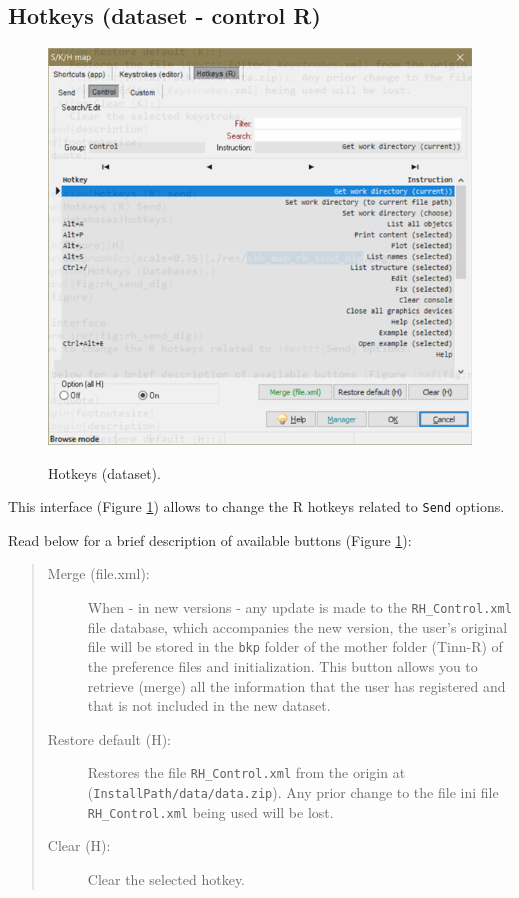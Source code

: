 \subsection{Hotkeys (dataset - control R)}

\begin{figure}[H]
  \includegraphics[scale=0.8]{./res/dlg_skh_map_rh_control.png}\\
  \caption{Hotkeys (dataset).}
  \label{fig:rh_control_dlg}
\end{figure}

This interface
(Figure \ref{fig:rh_control_dlg})
allows to change the R hotkeys related to \texttt{Send} options.

Read below for a brief description of available buttons (Figure \ref{fig:rh_control_dlg}):

\begin{quote}
  \begin{footnotesize}
    \begin{description}
      \item[Merge (file.xml):]
        When - in new versions - any update is made to the \texttt{RH\_Control.xml} file database,
        which accompanies the new version, the user's original file will be stored in
        the \texttt{bkp} folder of the mother folder (Tinn-R) of the preference files and initialization.
        This button allows you to retrieve (merge) all the information that the user has registered
        and that is not included in the new dataset.
      \item[Restore default (H):]
        Restores the file \texttt{RH\_Control.xml} from the origin at
        (\texttt{InstallPath/data/data.zip}). Any prior change to the file ini file
        \texttt{RH\_Control.xml} being used will be lost.
      \item[Clear (H):]
        Clear the selected hotkey.
    \end{description}
  \end{footnotesize}
\end{quote}


